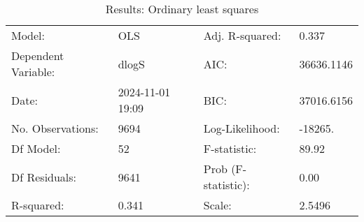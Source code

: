 \begin{table}
\caption{Results: Ordinary least squares}
\label{}
\begin{center}
\begin{tabular}{llll}
\hline
Model:              & OLS              & Adj. R-squared:     & 0.337       \\
Dependent Variable: & dlogS            & AIC:                & 36636.1146  \\
Date:               & 2024-11-01 19:09 & BIC:                & 37016.6156  \\
No. Observations:   & 9694             & Log-Likelihood:     & -18265.     \\
Df Model:           & 52               & F-statistic:        & 89.92       \\
Df Residuals:       & 9641             & Prob (F-statistic): & 0.00        \\
R-squared:          & 0.341            & Scale:              & 2.5496      \\
\hline
\end{tabular}
\end{center}


\end{table}
